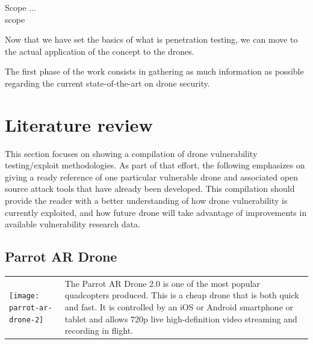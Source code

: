 \begin{chaptercover}{Scope}%
{
{\large \hyphenation{} \bigletter{}{} {\color{red} ...}\newline\\}}%
{scope}

Now that we have set the basics of what is penetration testing, we can move to the actual application of the concept to the drones. 

The first phase of the work consists in gathering as much information as possible regarding the current state-of-the-art on drone security.

\section{Literature review}

This section focuses on showing a compilation of drone vulnerability testing/exploit methodologies. As part of that effort, the following emphasizes on giving a ready reference of one particular vulnerable drone and associated open source attack tools that have already been developed. This compilation should provide the reader with a better understanding of how drone vulnerability is currently exploited, and how future drone will take advantage of improvements in available vulnerability research data.

\subsection{Parrot AR Drone}

\begin{center}
\begin{tabular}{m{5cm}m{12.3cm}}
\hyphenation{produced}
\texttt{[image: parrot-ar-drone-2]} & The Parrot AR Drone 2.0 is one of the most popular quadcopters produced. This is a cheap drone that is both quick and fast. It is controlled by an iOS or Android smartphone or tablet and allows 720p live high-definition video streaming and recording in flight. \\
\end{tabular}
\end{center}


\end{chaptercover}
